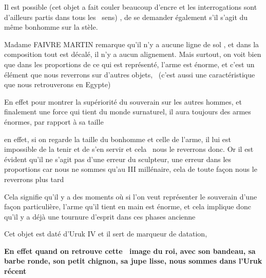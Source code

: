 \documentclass[a4paper]{article}
\begin{document}
{
Il est possible (cet objet a fait couler beaucoup d'encre et les
interrogations sont d'ailleurs partis dans tous les \ sens) , de se
demander également s'il s'agit du même bonhomme sur la stèle.}

{
Madame FAIVRE MARTIN remarque qu'il n'y a aucune ligne de sol , et dans
la composition tout est décalé, il n'y a aucun alignement. Mais
surtout, on voit bien que dans les proportions de ce qui est
représenté, l'arme est énorme, et c'est un élément que nous reverrons
sur d'autres objets, \ (c'est aussi une caractéristique que nous
retrouverons en Egypte)}

{
En effet pour montrer la supériorité du souverain sur les autres hommes,
et finalement une force qui tient du monde surnaturel, il aura toujours
des armes énormes, par rapport à sa taille }

{
en effet, si on regarde la taille du bonhomme et celle de l'arme, il lui
est impossible de la tenir et de s'en servir et cela \ nous le
reverrons donc. Or il est évident qu'il ne s'agit pas d'une erreur du
sculpteur, une erreur dans les proportions car nous ne sommes qu'au III
millénaire, cela de toute façon nous le reverrons plus tard}

{
Cela signifie qu'il y a des moments où si l'on veut représenter le
souverain d'une façon particulière, l'arme qu'il tient en main est
énorme, et cela implique donc qu'il y a déjà une tournure d'esprit dans
ces phases ancienne}


\bigskip

{
Cet objet est daté d'Uruk IV et il sert de marqueur de datation, }

{
\textbf{En effet quand on retrouve cette \ image du roi, avec son
bandeau, sa barbe ronde, son petit chignon, sa jupe lisse, nous sommes
dans l'Uruk récent}}


\bigskip


\bigskip


\bigskip


\bigskip


\bigskip


\bigskip


\bigskip


\bigskip


\bigskip


\bigskip


\bigskip
\end{document}
